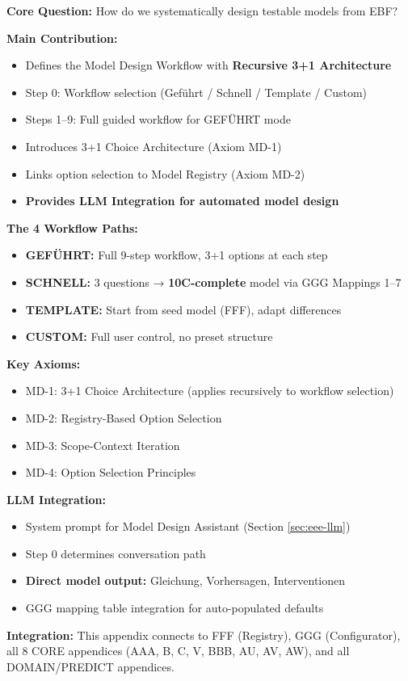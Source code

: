 \begin{tcolorbox}[colback=green!10!white, colframe=green!75!black,
    title=\textbf{Appendix DSN: Summary}]

\textbf{Core Question:} How do we systematically design testable models from EBF?

\textbf{Main Contribution:}
\begin{itemize}[nosep]
    \item Defines the Model Design Workflow with \textbf{Recursive 3+1 Architecture}
    \item Step 0: Workflow selection (Geführt / Schnell / Template / Custom)
    \item Steps 1--9: Full guided workflow for GEFÜHRT mode
    \item Introduces 3+1 Choice Architecture (Axiom MD-1)
    \item Links option selection to Model Registry (Axiom MD-2)
    \item \textbf{Provides LLM Integration for automated model design}
\end{itemize}

\textbf{The 4 Workflow Paths:}
\begin{itemize}[nosep]
    \item \textbf{GEFÜHRT:} Full 9-step workflow, 3+1 options at each step
    \item \textbf{SCHNELL:} 3 questions → \textbf{10C-complete} model via GGG Mappings 1--7
    \item \textbf{TEMPLATE:} Start from seed model (FFF), adapt differences
    \item \textbf{CUSTOM:} Full user control, no preset structure
\end{itemize}

\textbf{Key Axioms:}
\begin{itemize}[nosep]
    \item MD-1: 3+1 Choice Architecture (applies recursively to workflow selection)
    \item MD-2: Registry-Based Option Selection
    \item MD-3: Scope-Context Iteration
    \item MD-4: Option Selection Principles
\end{itemize}

\textbf{LLM Integration:}
\begin{itemize}[nosep]
    \item System prompt for Model Design Assistant (Section \ref{sec:eee-llm})
    \item Step 0 determines conversation path
    \item \textbf{Direct model output:} Gleichung, Vorhersagen, Interventionen
    \item GGG mapping table integration for auto-populated defaults
\end{itemize}

\textbf{Integration:} This appendix connects to FFF (Registry), GGG (Configurator),
all 8 CORE appendices (AAA, B, C, V, BBB, AU, AV, AW), and all DOMAIN/PREDICT appendices.

\end{tcolorbox}


